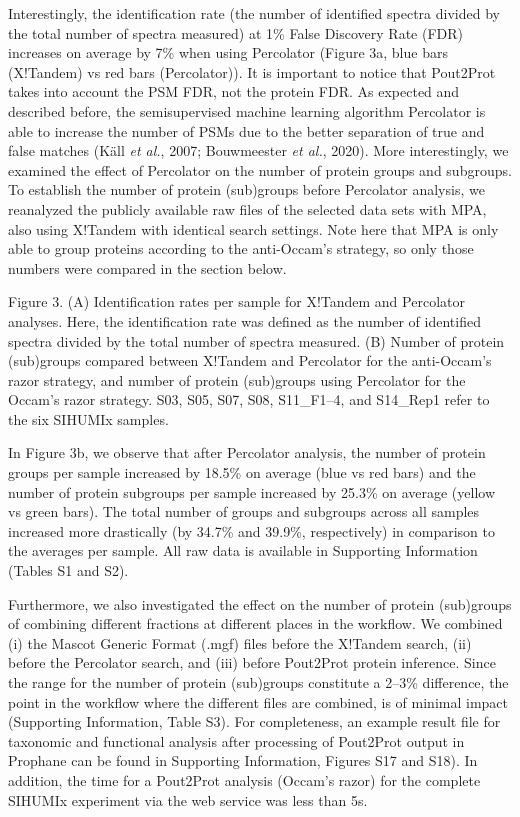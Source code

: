 Interestingly, the identification rate (the number of identified spectra
divided by the total number of spectra measured) at 1\% False Discovery
Rate (FDR) increases on average by 7\% when using Percolator (Figure 3a,
blue bars (X!Tandem) vs red bars (Percolator)). It is important to
notice that Pout2Prot takes into account the PSM FDR, not the protein
FDR. As expected and described before, the semisupervised machine
learning algorithm Percolator is able to increase the number of PSMs due
to the better separation of true and false matches (Käll \emph{et al.},
2007; Bouwmeester \emph{et al.}, 2020). More interestingly, we examined
the effect of Percolator on the number of protein groups and subgroups.
To establish the number of protein (sub)groups before Percolator
analysis, we reanalyzed the publicly available raw files of the selected
data sets with MPA, also using X!Tandem with identical search settings.
Note here that MPA is only able to group proteins according to the
anti-Occam's strategy, so only those numbers were compared in the
section below.

Figure 3. (A) Identification rates per sample for X!Tandem and
Percolator analyses. Here, the identification rate was defined as the
number of identified spectra divided by the total number of spectra
measured. (B) Number of protein (sub)groups compared between X!Tandem
and Percolator for the anti-Occam's razor strategy, and number of
protein (sub)groups using Percolator for the Occam's razor strategy.
S03, S05, S07, S08, S11\_F1--4, and S14\_Rep1 refer to the six SIHUMIx
samples.

In Figure 3b, we observe that after Percolator analysis, the number of
protein groups per sample increased by 18.5\% on average (blue vs red
bars) and the number of protein subgroups per sample increased by 25.3\%
on average (yellow vs green bars). The total number of groups and
subgroups across all samples increased more drastically (by 34.7\% and
39.9\%, respectively) in comparison to the averages per sample. All raw
data is available in Supporting Information (Tables S1 and S2).

Furthermore, we also investigated the effect on the number of protein
(sub)groups of combining different fractions at different places in the
workflow. We combined (i) the Mascot Generic Format (.mgf) files before
the X!Tandem search, (ii) before the Percolator search, and (iii) before
Pout2Prot protein inference. Since the range for the number of protein
(sub)groups constitute a 2--3\% difference, the point in the workflow
where the different files are combined, is of minimal impact (Supporting
Information, Table S3). For completeness, an example result file for
taxonomic and functional analysis after processing of Pout2Prot output
in Prophane can be found in Supporting Information, Figures S17 and
S18). In addition, the time for a Pout2Prot analysis (Occam's razor) for
the complete SIHUMIx experiment via the web service was less than 5s.

